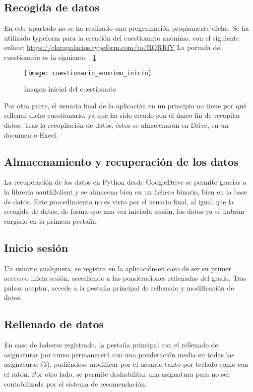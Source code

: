 \subsection{Recogida de datos}
En este apartado no se ha realizado una programación propiamente dicha. Se ha utilizado typeform para la creación del cuestionario anónimo. con el siguiente enlace: \url{https://clarapalacios.typeform.com/to/RQRRfY}
La portada del cuestionario es la siguiente. 
~\ref{fig:D.1.1}
\begin{figure}[h]
\centering
\texttt{[image: cuestionario\_anonimo\_inicio]}
\caption{Imagen inicial del cuestionario}
\label{fig:D.1.1}
\end{figure}
Por otra parte, el usuario final de la aplicación en un principio no tiene por qué rellenar dicho cuestionario, ya que ha sido creado con el único fin de recopilar datos. 
Tras la recopilación de datos, éstos se almacenarán en Drive, en un documento Excel. 
\subsection{Almacenamiento y recuperación de los datos}
La recuperación de los datos en Python desde GoogleDrive se permite gracias a la librería oauth2client y se almacena bien en un fichero binario, bien en la base de datos. 
Este procedimiento no es visto por el usuario final, al igual que la recogida de datos, de forma que una vez iniciada sesión, los datos ya se habrán cargado en la primera pestaña. 

\subsection{Inicio sesión}
Un usuario cualquiera, se registra en la aplicación-en caso de ser su primer acceso-o inicia sesión, accediendo a las ponderaciones rellenadas del grado.  Tras pulsar aceptar, accede a la pestaña principal de rellenado y modificación de datos.

\subsection{Rellenado de datos}
En caso de haberse registrado, la pestaña principal con el rellenado de asignaturas por curso permanecerá con una ponderación media en todas las asignaturas (3), pudiéndose modificar por el usuario tanto por teclado como con el ratón. Por otro lado, se permite deshabilitar una asignatura para no ser contabilizada por el sistema de recomendación. 
 
